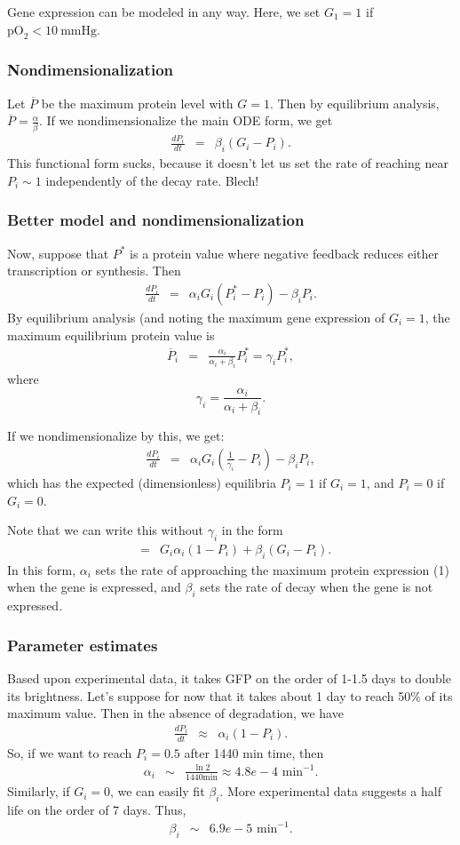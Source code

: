 \documentclass[12pt]{article}
\newcommand{\oxy}{  {\textrm{pO}_2} }
\newcommand{\mmHg}{\: \textrm{mmHg} }
\newcommand{\beqa}{\begin{eqnarray}}
\newcommand{\eeqa}{\end{eqnarray}}
\newcommand{\beq}{\begin{equation}}
\newcommand{\eeq}{\end{equation}}
\begin{document}
Gene expression can be modeled in any way. Here, we set $G_1 =1$ if $\oxy < 10 \mmHg$. 

\subsubsection{Nondimensionalization}
Let $\overline{P}$ be the maximum protein level with $G = 1$. Then by equilibrium analysis, 
$\overline{P} = \frac{\alpha}{\beta}$. If we nondimensionalize the main ODE form, we get 
\beqa
\frac{dP_i}{dt} & = & \beta_i \left( G_i - P_i \right). 
\eeqa
This functional form sucks, because it doesn't let us set the rate of reaching near $P_i \sim 1$ independently 
of the decay rate. Blech!

\subsubsection{Better model and nondimensionalization}
Now, suppose that $P^*$ is a protein value where negative feedback reduces either transcription or synthesis. Then 
\beqa
\frac{ dP_i }{dt } & = & \alpha_i G_i \left( P_i^* - P_i \right) - \beta_i P_i. 
\eeqa
By equilibrium analysis (and noting the maximum gene expression of $G_i = 1$, the maximum 
equilibrium protein value is 
\beqa
\overline{P}_i & =& 
\frac{\alpha_i }{\alpha_i + \beta_i } P_i^* = 
\gamma_i P_i^*, 
\eeqa
where
\beq
\gamma_i = \frac{ \alpha_i }{ \alpha_i + \beta_i }. 
\eeq


If we nondimensionalize by this, we get: 
\beqa
\frac{ dP_i }{dt} & = & 
\alpha_i G_i \left( \frac{1}{\gamma_i} - P_i \right) - \beta_i P_i, 
\eeqa
which has the expected (dimensionless) equilibria $P_i = 1$ if $G_i = 1$, 
and $P_i = 0$ if $G_i = 0$. 

Note that we can write this without $\gamma_i$ in the form 
\beqa
& = & 
G_i \alpha_i \left( 1 - P_i \right) + \beta_i \left( G_i - P_i \right) .
\eeqa
In this form, $\alpha_i$ sets the rate of approaching the maximum protein expression (1) 
when the gene is expressed, and $\beta_i$ sets the rate of decay when the gene is not expressed. 

\subsubsection{Parameter estimates}
Based upon experimental data, it takes GFP on the order of 1-1.5 days to double its brightness. 
Let's suppose for now that it takes about 1 day to reach 50\% of its maximum value. 
Then in the absence of degradation, we have 
\beqa
\frac{dP_i}{dt} & \approx & \alpha_i \left( 1 - P_i \right). 
\eeqa
So, if we want to reach $P_i = 0.5$ after 1440 min time, then 
\beqa
\alpha_i &  \sim & \frac{ \ln{2} }{ 1440 \mathrm{ min}} \approx 4.8e-4  \textrm{ min}^{-1}. 
\eeqa
Similarly, if $G_i = 0$, we can easily fit $\beta_i$. More experimental data suggests a 
half life on the order of 7 days. Thus, 
\beqa
\beta_i & \sim & 6.9e-5 \textrm{ min}^{-1}.
\eeqa
\end{document}
